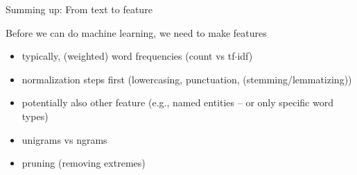 \documentclass{beamer}
\begin{document}
\begin{frame}[plain]
Summing up: From text to feature
\end{frame}

\begin{frame}{Before we can do machine learning, we need to make features}

\begin{itemize}[<+->]
	\item typically, (weighted) word frequencies (count vs tf$\cdot$idf)
	\item normalization steps first (lowercasing, punctuation, (stemming/lemmatizing))
	\item potentially also other feature (e.g., named entities -- or only specific word types)
	\item unigrams vs ngrams
	\item pruning (removing extremes)
\end{itemize}


\end{frame}
\end{document}
